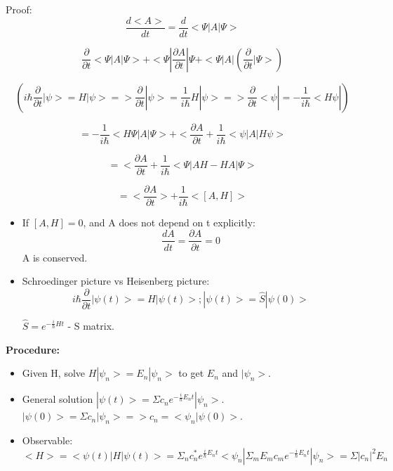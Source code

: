 \documentclass[12pt,a4paper]{article}
\begin{document}
Proof:
\[
\frac{d<A>}{dt}= \frac{d}{dt} < \Psi |A| \Psi >
\]

\[
\frac{\partial}{\partial t} < \Psi |A| \Psi > + < \Psi | \frac{\partial A}{\partial t} | \Psi + < \Psi |A| (\frac{\partial}{\partial t} | \Psi > )
\]

\[
( i \hbar \frac{\partial}{\partial t} | \psi > = H | \psi > => \frac{\partial}{\partial t} | \psi > = \frac{1}{i \hbar} H | \psi > => \frac{\partial}{\partial t} < \psi | = - \frac{1}{i \hbar} <H \psi | )
\]

\[
= -\frac{1}{i \hbar} <H \Psi |A| \Psi > + <\frac{\partial A}{\partial t}+ \frac{1}{i \hbar} <\psi |A| H \psi >
\]

\[
=<\frac{\partial A}{\partial t} + \frac{1}{i \hbar} 
< \Psi |AH-HA| \Psi >
\]

\[
= < \frac{\partial A}{\partial t} > + \frac{1}{i \hbar} < [A,H]>
\]

\begin{itemize}

\item If $[A,H]=0$, and A does not depend on t explicitly:
\[
\frac{dA}{dt}=\frac{\partial A}{\partial t} = 0
\]
A is conserved.

\item Schroedinger picture vs Heisenberg picture:
\[
i \hbar \frac{\partial}{\partial t} | \psi (t) >=H | \psi (t)>; | \psi (t)>= \hat{S} | \psi (0)>
\]

$\hat{S}=e^{- \frac{i}{\hbar} H t}$ - S matrix.

\end{itemize}

\textbf{Procedure:}\\

\begin{itemize}

\item Given H, solve $H |\psi _n >= E_n | \psi _n >$ to get $E_n$ and $ | \psi _n >$.

\item General solution $ | \psi (t) > = \Sigma c_n e^{ - \frac{i}{\hbar} E_n t} | \psi _n >$.\\
$| \psi (0) > = \Sigma c_n | \psi _n > => c_n = < \psi _n | \psi (0) >$.

\item Observable:
\[
<H>= < \psi (t) |H| \psi (t) > = \Sigma _n c_n ^* e^{\frac{i}{\hbar} E_n t} < \psi _n | \Sigma _m E_m c_m e^{- \frac{i}{\hbar} E_n t} | \psi _n > = \Sigma |c_n|^2 E_n
\]

\end{itemize}
\end{document}
